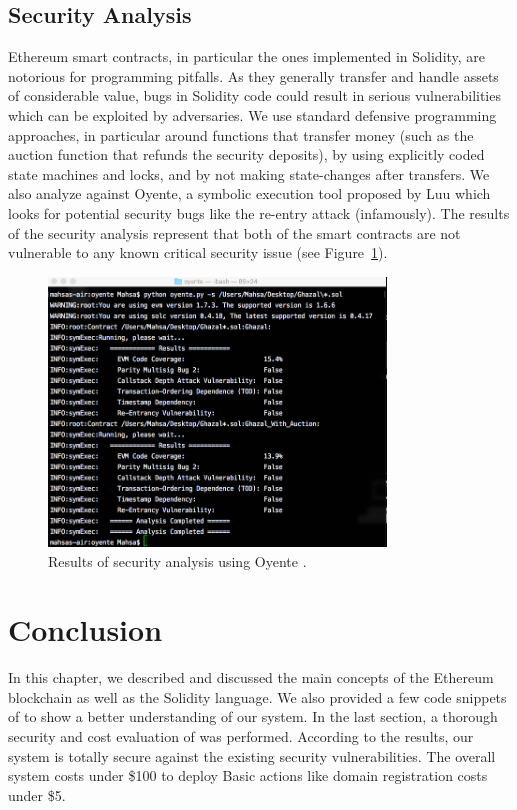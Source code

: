 \subsection{Security Analysis}

Ethereum smart contracts, in particular the ones implemented in Solidity, are notorious for programming pitfalls. As they generally transfer and handle assets of considerable value, bugs in Solidity code could result in serious vulnerabilities which can be exploited by adversaries. We use standard defensive programming approaches, in particular around functions that transfer money (such as the auction function that refunds the security deposits), by using explicitly coded state machines and locks, and by not making state-changes after transfers. We also analyze \Ghazalstar against Oyente, a symbolic execution tool proposed by Luu \etal\cite{luu2016making} which looks for potential security bugs like the re-entry attack (infamously). The results of the security analysis represent that both of the smart contracts are not vulnerable to any known critical security issue (see Figure~\ref{fig:oyente}).

\begin{figure}[t]
\centering
\includegraphics[width=0.8\textwidth]{Fig/GhazalstarOyenteResult.png}
\caption{\footnotesize{Results of \Ghazalstar security analysis using Oyente \cite{luu2016making}.}\label{fig:oyente}}
\end{figure}

\section{Conclusion}

In this chapter, we described and discussed the main concepts of the Ethereum blockchain as well as the Solidity language. We also provided a few code snippets of \Ghazalstar to show a better understanding of our system. In the last section, a thorough security and cost evaluation of \Ghazalstar was performed. According to the results, our system is totally secure against the existing security vulnerabilities. The overall system costs under \$100 to deploy Basic actions like domain registration costs under \$5.


 